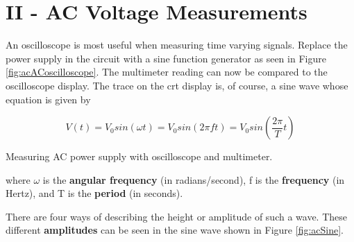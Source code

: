 \section{{\bf II - AC Voltage Measurements}}
An oscilloscope is most useful when measuring time varying signals. Replace the power supply in the circuit with a sine function generator as seen in Figure \ref{fig:acACoscilloscope}. The multimeter reading can now be compared to the oscilloscope display. The trace on the crt display is, of course, a sine wave whose equation is given by

\begin{equation}
V(t)=V_0 sin(\omega t)=V_0sin(2\pi ft)=V_0sin\left(\frac{2\pi}{T}t\right)
\label{equ:ac1}
\end{equation}

\begin{marginfigure}
\caption{Measuring AC power supply with oscilloscope and multimeter.}
\label{fig:acACoscilloscope}
\end{marginfigure}

\noindent where $\omega$ is the {\bf angular frequency} (in radians/second), f is the {\bf frequency} (in Hertz), and T is the {\bf period} (in seconds).

There are four ways of describing the height or amplitude of such a wave. These different {\bf amplitudes} can be seen in the sine wave shown in Figure \ref{fig:acSine}.


